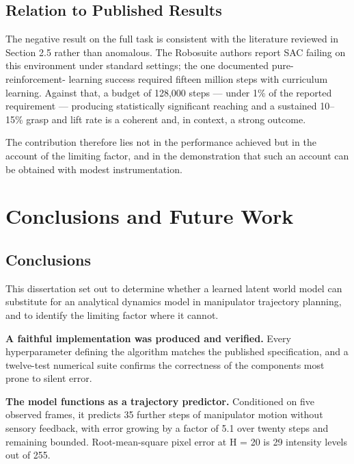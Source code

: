 \documentclass[12pt,a4paper,oneside]{report}
\begin{document}
\hypertarget{relation-to-published-results}{%
\section{Relation to Published Results}\label{relation-to-published-results}}

The negative result on the full task is consistent with the literature reviewed
in Section 2.5 rather than anomalous. The Robosuite authors report SAC failing on
this environment under standard settings; the one documented pure-reinforcement-
learning success required fifteen million steps with curriculum learning. Against
that, a budget of 128,000 steps --- under 1\% of the reported requirement ---
producing statistically significant reaching and a sustained 10--15\% grasp and
lift rate is a coherent and, in context, a strong outcome.

The contribution therefore lies not in the performance achieved but in the
account of the limiting factor, and in the demonstration that such an account can
be obtained with modest instrumentation.

\newpage

\hypertarget{conclusions-and-future-work}{%
\chapter{Conclusions and Future Work}\label{conclusions-and-future-work}}

\hypertarget{conclusions}{%
\section{Conclusions}\label{conclusions}}

This dissertation set out to determine whether a learned latent world model can
substitute for an analytical dynamics model in manipulator trajectory planning,
and to identify the limiting factor where it cannot.

\textbf{A faithful implementation was produced and verified.} Every hyperparameter
defining the algorithm matches the published specification, and a twelve-test
numerical suite confirms the correctness of the components most prone to silent
error.

\textbf{The model functions as a trajectory predictor.} Conditioned on five observed
frames, it predicts 35 further steps of manipulator motion without sensory
feedback, with error growing by a factor of 5.1 over twenty steps and remaining
bounded. Root-mean-square pixel error at H = 20 is 29 intensity levels out of
255.
\end{document}
